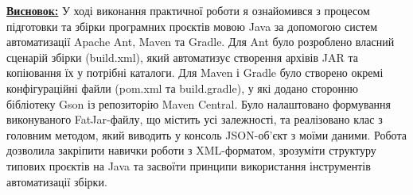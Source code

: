\documentclass[12pt,a4paper]{article}
\begin{document}
    \textbf{\underline{Висновок:}} У ході виконання практичної роботи я ознайомився з процесом підготовки та
збірки програмних проєктів мовою Java за допомогою систем автоматизації
Apache Ant, Maven та Gradle. Для Ant було розроблено власний сценарій
збірки (build.xml), який автоматизує створення архівів JAR та копіювання їх у
потрібні каталоги. Для Maven і Gradle було створено окремі конфігураційні
файли (pom.xml та build.gradle), у які додано сторонню бібліотеку Gson із
репозиторію Maven Central. Було налаштовано формування виконуваного
FatJar-файлу, що містить усі залежності, та реалізовано клас з головним
методом, який виводить у консоль JSON-об’єкт з моїми даними. Робота дозволила закріпити навички роботи з XML-форматом, зрозуміти
структуру типових проєктів на Java та засвоїти принципи використання
інструментів автоматизації збірки.
\end{document}
